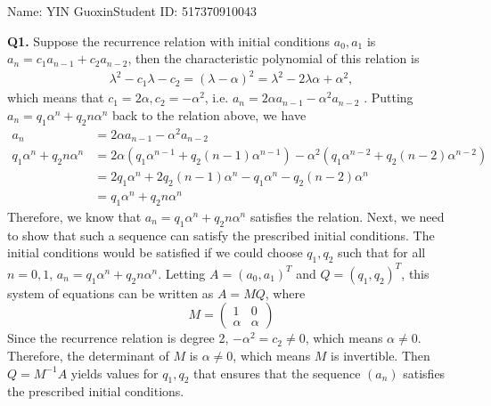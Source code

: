 \documentclass{article}[12pt]
\begin{document}
\noindent

\noindent{}
\begin{center}
\footnotesize{\quad Name: YIN Guoxin\quad Student ID: 517370910043}


\end{center}

\noindent \textbf{Q1.}
Suppose the recurrence relation with initial conditions $a_0,a_1$ is 
$a_n=c_1a_{n-1}+c_2a_{n-2}$, then the characteristic polynomial of this relation is 
\begin{align*}
\lambda^2-c_1\lambda-c_2=(\lambda-\alpha)^2=\lambda^2-2\lambda\alpha+\alpha^2,
\end{align*}
which means that $c_1=2\alpha,c_2=-\alpha^2$, i.e. $a_n=2\alpha a_{n-1}-\alpha^2a_{n-2}$ . Putting $a_{n}=q_{1} \alpha^{n}+q_{2} n \alpha^{n}$ back to the relation above, we have 
\begin{align*}
a_n&=2\alpha a_{n-1}-\alpha^2a_{n-2}\\
q_{1} \alpha^{n}+q_{2} n \alpha^{n}&=2\alpha (q_{1} \alpha^{n-1}+q_{2} (n-1) \alpha^{n-1})-\alpha^2( q_{1} \alpha^{n-2}+q_{2} (n-2) \alpha^{n-2})\\
&=2q_{1} \alpha^{n}+2q_{2} (n-1) \alpha^{n}-q_{1} \alpha^{n}-q_{2} (n-2) \alpha^{n}\\
&=q_{1} \alpha^{n}+q_{2} n \alpha^{n}
\end{align*}
Therefore, we know that $a_{n}=q_{1} \alpha^{n}+q_{2} n \alpha^{n}$ satisfies the relation. Next, we need to show that such a sequence can satisfy the prescribed initial conditions. The initial conditions would be satisfied if we could choose $q_1,q_2$ such that for all $n=0,1$, $a_{n}=q_{1} \alpha^{n}+q_{2} n \alpha^{n}$. Letting $A=(a_0,a_1)^T$ and $Q=(q_1,q_2)^T$, this system of equations can be written as $A=MQ$, where 
\begin{equation*}
M=\begin{pmatrix} 1 & 0 \\ \alpha & \alpha \end{pmatrix}
\end{equation*}
Since the recurrence relation is degree 2, $-\alpha^2=c_2\not=0$, which means $\alpha\not=0$. Therefore, the determinant of $M$ is $\alpha\not=0$, which means $M$ is invertible. Then $Q=M^{-1}A$ yields values for $q_1,q_2$ that ensures that the sequence $(a_n)$ satisfies the prescribed initial conditions.\\
\end{document}
